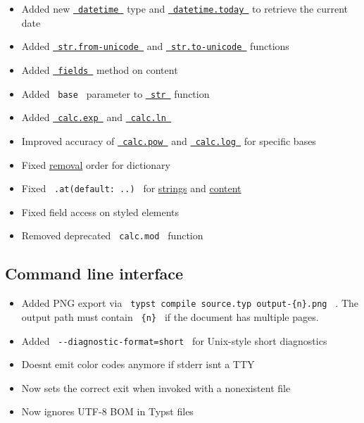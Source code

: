 \begin{itemize}
\tightlist
\item
  Added new
  \href{/docs/reference/foundations/datetime/}{\texttt{\ datetime\ }}
  type and
  \href{/docs/reference/foundations/datetime/\#definitions-today}{\texttt{\ datetime.today\ }}
  to retrieve the current date
\item
  Added
  \href{/docs/reference/foundations/str/\#definitions-from-unicode}{\texttt{\ str.from-unicode\ }}
  and
  \href{/docs/reference/foundations/str/\#definitions-to-unicode}{\texttt{\ str.to-unicode\ }}
  functions
\item
  Added
  \href{/docs/reference/foundations/content/\#definitions-fields}{\texttt{\ fields\ }}
  method on content
\item
  Added \texttt{\ base\ } parameter to
  \href{/docs/reference/foundations/str/}{\texttt{\ str\ }} function
\item
  Added
  \href{/docs/reference/foundations/calc/\#functions-exp}{\texttt{\ calc.exp\ }}
  and
  \href{/docs/reference/foundations/calc/\#functions-ln}{\texttt{\ calc.ln\ }}
\item
  Improved accuracy of
  \href{/docs/reference/foundations/calc/\#functions-pow}{\texttt{\ calc.pow\ }}
  and
  \href{/docs/reference/foundations/calc/\#functions-log}{\texttt{\ calc.log\ }}
  for specific bases
\item
  Fixed
  \href{/docs/reference/foundations/dictionary/\#definitions-remove}{removal}
  order for dictionary
\item
  Fixed \texttt{\ .at(default:\ ..)\ } for
  \href{/docs/reference/foundations/str/\#definitions-at}{strings} and
  \href{/docs/reference/foundations/content/\#definitions-at}{content}
\item
  Fixed field access on styled elements
\item
  Removed deprecated \texttt{\ calc.mod\ } function
\end{itemize}

\subsection{Command line interface}\label{command-line-interface}

\begin{itemize}
\tightlist
\item
  Added PNG export via
  \texttt{\ typst\ compile\ source.typ\ output-\{n\}.png\ } . The output
  path must contain \texttt{\ \{n\}\ } if the document has multiple
  pages.
\item
  Added \texttt{\ -\/-diagnostic-format=short\ } for Unix-style short
  diagnostics
\item
  Doesn\textquotesingle t emit color codes anymore if stderr
  isn\textquotesingle t a TTY
\item
  Now sets the correct exit when invoked with a nonexistent file
\item
  Now ignores UTF-8 BOM in Typst files
\end{itemize}

